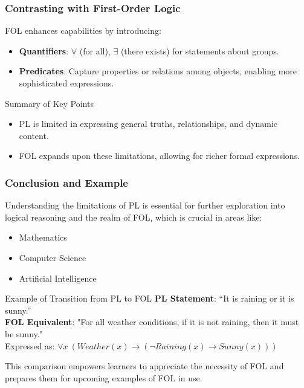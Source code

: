 \documentclass[aspectratio=169]{beamer}
\begin{document}
\begin{frame}[fragile]
    \frametitle{Contrasting with First-Order Logic}
    
    FOL enhances capabilities by introducing:
    
    \begin{itemize}
        \item \textbf{Quantifiers}: $\forall$ (for all), $\exists$ (there exists) for statements about groups.
        \item \textbf{Predicates}: Capture properties or relations among objects, enabling more sophisticated expressions.
    \end{itemize}
    
    \begin{block}{Summary of Key Points}
        \begin{itemize}
            \item PL is limited in expressing general truths, relationships, and dynamic content.
            \item FOL expands upon these limitations, allowing for richer formal expressions.
        \end{itemize}
    \end{block}
\end{frame}

\begin{frame}[fragile]
    \frametitle{Conclusion and Example}
    
    Understanding the limitations of PL is essential for further exploration into logical reasoning and the realm of FOL, which is crucial in areas like:
    
    \begin{itemize}
        \item Mathematics
        \item Computer Science
        \item Artificial Intelligence
    \end{itemize}
    
    \begin{block}{Example of Transition from PL to FOL}
        \textbf{PL Statement}: “It is raining or it is sunny.” \\
        \textbf{FOL Equivalent}: "For all weather conditions, if it is not raining, then it must be sunny." \\
        Expressed as: $\forall x \ (Weather(x) \rightarrow (\neg Raining(x) \rightarrow Sunny(x)))$
    \end{block}
    
    This comparison empowers learners to appreciate the necessity of FOL and prepares them for upcoming examples of FOL in use.
\end{frame}
\end{document}
